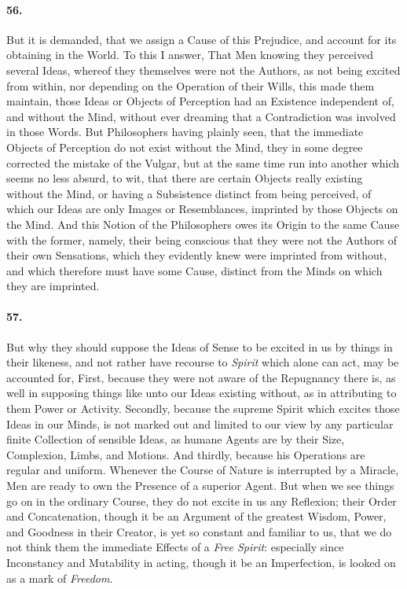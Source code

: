 \documentclass[]{article}
\newenvironment{sectionbody}{\begin{multicols}{2}}{\end{multicols}}
\begin{document}
\begin{sectionbody}
\paragraph{56.} But it is demanded, that we assign a Cause of this Prejudice, and
account for its obtaining in the World.  To this I answer, That
Men knowing they perceived several Ideas, whereof they themselves
were not the Authors, as not being excited from within, nor
depending on the Operation of their Wills, this made them
maintain, those Ideas or Objects of Perception had an Existence
independent of, and without the Mind, without ever dreaming that
a Contradiction was involved in those Words.  But Philosophers
having plainly seen, that the immediate Objects of Perception do
not exist without the Mind, they in some degree corrected the
mistake of the Vulgar, but at the same time run into another
which seems no less absurd, to wit, that there are certain
Objects really existing without the Mind, or having a Subsistence
distinct from being perceived, of which our Ideas are only Images
or Resemblances, imprinted by those Objects on the Mind.  And
this Notion of the Philosophers owes its Origin to the same Cause
with the former, namely, their being conscious that they were not
the Authors of their own Sensations, which they evidently knew
were imprinted from without, and which therefore must have some
Cause, distinct from the Minds on which they are imprinted.



\paragraph{57.} But why they should suppose the Ideas of Sense to be excited in
us by things in their likeness, and not rather have recourse to
\emph{Spirit} which alone can act, may be accounted for, First,
because they were not aware of the Repugnancy there is, as well
in supposing things like unto our Ideas existing without, as in
attributing to them Power or Activity.  Secondly, because the
supreme Spirit which excites those Ideas in our Minds, is not
marked out and limited to our view by any particular finite
Collection of sensible Ideas, as humane Agents are by their Size,
Complexion, Limbs, and Motions.  And thirdly, because his
Operations are regular and uniform.  Whenever the Course of
Nature is interrupted by a Miracle, Men are ready to own the
Presence of a superior Agent.  But when we see things go on in
the ordinary Course, they do not excite in us any Reflexion;
their Order and Concatenation, though it be an Argument of the
greatest Wisdom, Power, and Goodness in their Creator, is yet so
constant and familiar to us, that we do not think them the
immediate Effects of a \emph{Free Spirit}: especially since
Inconstancy and Mutability in acting, though it be an
Imperfection, is looked on as a mark of \emph{Freedom}.




\end{sectionbody}
\end{document}
